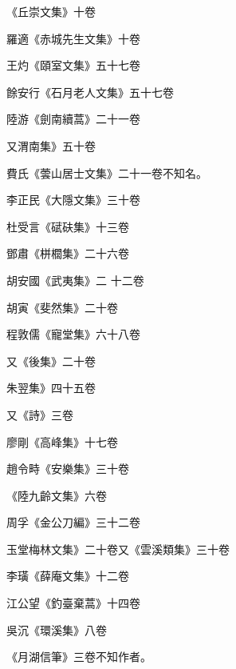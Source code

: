 \begin{pinyinscope}
 《丘崇文集》十卷



 羅適《赤城先生文集》十卷



 王灼《頤室文集》五十七卷



 餘安行《石月老人文集》五十七卷



 陸游《劍南續蒿》二十一卷



 又渭南集》五十卷



 費氏《蕓山居士文集》二十一卷不知名。



 李正民《大隱文集》三十卷



 杜受言《碔砆集》十三卷



 鄧肅《栟櫚集》二十六卷



 胡安國《武夷集》二
 十二卷



 胡寅《斐然集》二十卷



 程敦儒《寵堂集》六十八卷



 又《後集》二十卷



 朱翌集》四十五卷



 又《詩》三卷



 廖剛《高峰集》十七卷



 趙令畤《安樂集》三十卷



 《陸九齡文集》六卷



 周孚《金公刀編》三十二卷



 玉堂梅林文集》二十卷又《雲溪類集》三十卷



 李璜《薛庵文集》十二卷



 江公望《釣臺棄蒿》十四卷



 吳沉《環溪集》八卷



 《月湖信筆》三卷不知作者。




\end{pinyinscope}
